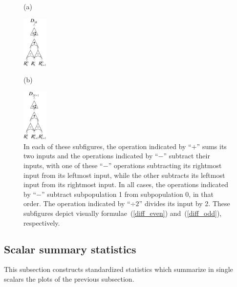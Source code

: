 \documentclass{article}
\begin{document}
\begin{figure}
\vspace{.2in}
\begin{centering}
\hfil
(a) \parbox{0.111\textwidth}
{\includegraphics[width=0.111\textwidth]{./figures/diffs0.pdf}}
\hfil
(b) \parbox{0.111\textwidth}
{\includegraphics[width=0.111\textwidth]{./figures/diffs1.pdf}}
\end{centering}
\caption{In each of these subfigures, the operation indicated by ``$+$'' sums
its two inputs and the operations indicated by ``$-$'' subtract their inputs,
with one of these ``$-$'' operations subtracting its rightmost input
from its leftmost input, while the other subtracts its leftmost input
from its rightmost input.
In all cases, the operations indicated by ``$-$'' subtract
subpopulation 1 from subpopulation 0, in that order.
The operation indicated by ``$\div 2$'' divides its input by 2.
These subfigures depict visually formulae~(\ref{diff_even})
and~(\ref{diff_odd}), respectively.
}
\label{diffs}
\end{figure}


\subsection{Scalar summary statistics}
\label{scalarstats}

This subsection constructs standardized statistics
which summarize in single scalars the plots of the previous subsection.
\end{document}
